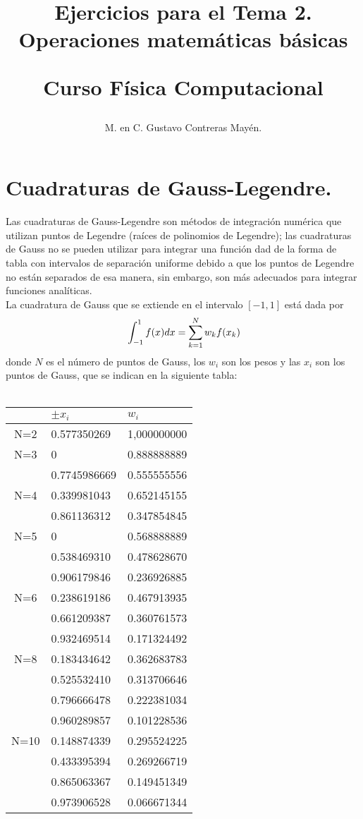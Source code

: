 \documentclass[12pt]{article}
\author{M. en C. Gustavo Contreras Mayén.}
\title{Ejercicios para el Tema 2.\\ Operaciones matemáticas básicas\\ \begin{large}Curso Física Computacional\end{large}}
\date{ }
\begin{document}
\maketitle
\section{Cuadraturas de Gauss-Legendre.}
Las cuadraturas de Gauss-Legendre son métodos de integración numérica que utilizan puntos de Legendre (raíces de polinomios de Legendre); las cuadraturas de Gauss no se pueden utilizar para integrar una función dad de la forma de tabla con intervalos de separación uniforme debido a que los puntos de Legendre no están separados de esa manera, sin embargo, son más adecuados para integrar funciones analíticas.
\\
La cuadratura de Gauss que se extiende en el intervalo $[-1,1]$ está dada por
\begin{equation}{\label{eq:integral}}
\int_{-1}^{1} f(x) dx = \sum_{k=1}^{N}w_{k}f(x_{k})
\end{equation}
donde $N$ es el número de puntos de Gauss, los $w_{i}$ son los pesos y las $x_{i}$ son los puntos de Gauss, que se indican en la siguiente tabla: \\
\\
\begin{tabular}{c l l}
 & $\pm x_{i}$ & $w_{i}$ \\
\hline N=2 & 0.577350269  & 1,000000000 \\
\hline N=3 & 0            & 0.888888889 \\
    & 0.7745986669 & 0.555555556 \\
\hline N=4 & 0.339981043  & 0.652145155 \\
    & 0.861136312  & 0.347854845 \\
\hline N=5 & 0            & 0.568888889 \\
    & 0.538469310  & 0.478628670 \\
    & 0.906179846  & 0.236926885 \\
\hline N=6 & 0.238619186  & 0.467913935 \\
    & 0.661209387  & 0.360761573 \\
    & 0.932469514  & 0.171324492 \\
\hline N=8 & 0.183434642  & 0.362683783 \\
    & 0.525532410  & 0.313706646 \\
    & 0.796666478  & 0.222381034 \\
    & 0.960289857  & 0.101228536 \\
\hline N=10& 0.148874339  & 0.295524225 \\
    & 0.433395394  & 0.269266719 \\
    & 0.865063367  & 0.149451349 \\
    & 0.973906528  & 0.066671344 \\
\end{tabular}
\end{document}
